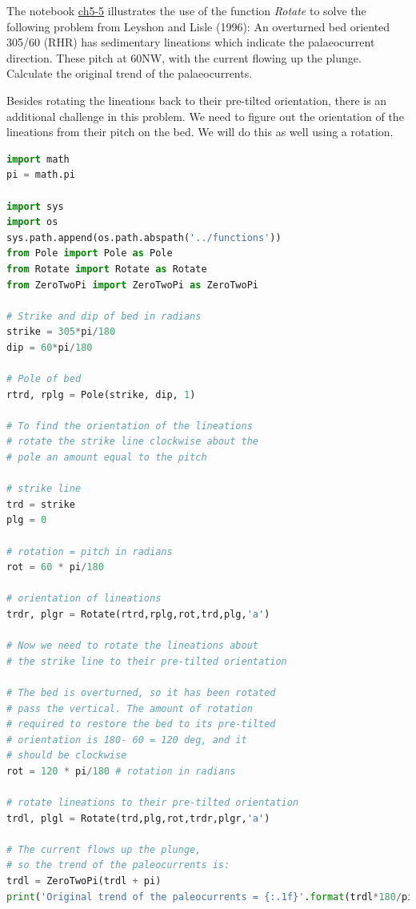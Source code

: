 \documentclass[a4paper , 12pt]{book}
\begin{document}
The  notebook  \href{https://github.com/nfcd/compGeo/blob/master/source/notebooks/ch5-5.ipynb}{ch5-5} illustrates  the  use  of  the  function \textit{Rotate} to solve the following problem from Leyshon  and Lisle  (1996): An overturned bed oriented 305/60 (RHR) has sedimentary lineations which indicate the palaeocurrent direction. These pitch at 60NW, with the current flowing up the plunge. Calculate the original trend of the palaeocurrents. 

Besides rotating the lineations back to their pre-tilted orientation, there is an additional challenge in this problem. We need to figure out the orientation of the lineations from their pitch on the bed. We will do this as well using a rotation.

\begin{center}
\begin{lstlisting}[language=Python, frame=single]
import math
pi = math.pi

import sys
import os
sys.path.append(os.path.abspath('../functions'))
from Pole import Pole as Pole
from Rotate import Rotate as Rotate
from ZeroTwoPi import ZeroTwoPi as ZeroTwoPi

# Strike and dip of bed in radians
strike = 305*pi/180
dip = 60*pi/180

# Pole of bed
rtrd, rplg = Pole(strike, dip, 1)

# To find the orientation of the lineations
# rotate the strike line clockwise about the 
# pole an amount equal to the pitch

# strike line
trd = strike 
plg = 0

# rotation = pitch in radians
rot = 60 * pi/180 

# orientation of lineations
trdr, plgr = Rotate(rtrd,rplg,rot,trd,plg,'a')

# Now we need to rotate the lineations about
# the strike line to their pre-tilted orientation

# The bed is overturned, so it has been rotated 
# pass the vertical. The amount of rotation
# required to restore the bed to its pre-tilted
# orientation is 180- 60 = 120 deg, and it
# should be clockwise
rot = 120 * pi/180 # rotation in radians

# rotate lineations to their pre-tilted orientation
trdl, plgl = Rotate(trd,plg,rot,trdr,plgr,'a')

# The current flows up the plunge, 
# so the trend of the paleocurrents is:
trdl = ZeroTwoPi(trdl + pi)
print('Original trend of the paleocurrents = {:.1f}'.format(trdl*180/pi))
\end{lstlisting}
\end{center}
\end{document}
